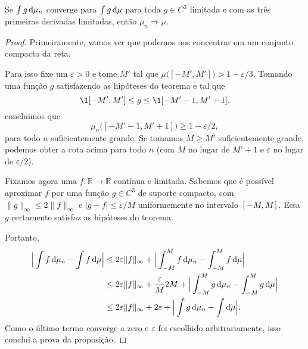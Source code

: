 \begin{proposition}
  \label{p:conv_distr_suave}
  Se $\int g \mathop{}\!\mathrm{d} \mu_n$ converge para $\int g \mathop{}\!\mathrm{d} \mu$ para toda $g \in C^3$ limitada e com as três primeiras derivadas limitadas, então $\mu_n \Rightarrow \mu$.
\end{proposition}

\begin{proof}
  Primeiramente, vamos ver que podemos nos concentrar em um conjunto compacto da reta.

  Para isso fixe um $\varepsilon > 0$ e tome $M'$ tal que $\mu\big( [-M', M'] \big) > 1 - \varepsilon / 3$.
  Tomando uma função $g$ satisfazendo as hipóteses do teorema e tal que
  \begin{equation}
    \1{[-M',M']} \leq g \leq \1{[-M'-1,M'+1]},
  \end{equation}
  concluimos que
  \begin{equation}
    \mu_n \big( [-M'-1, M'+1] \big) \geq 1 - \varepsilon/2,
  \end{equation}
  para todo $n$ suficientemente grande.
  Se tomamos $M \geq M'$ suficientemente grande, podemos obter a cota acima para todo $n$ (com $M$ no lugar de $M'+1$ e $\varepsilon$ no lugar de $\varepsilon/2$).

  Fixamos agora uma $f: \mathbb{R} \to \mathbb{R}$ contínua e limitada.
  Sabemos que é possível aproximar $f$ por uma função $g \in C^3$ de suporte compacto, com $\lVert g \rVert_\infty \leq 2 \lVert f \rVert_\infty$ e $|g - f| \leq \varepsilon/M$ uniformemente no intervalo $[-M,M]$.
  Essa $g$ certamente satisfaz as hipóteses do teorema.

  Portanto,
  \begin{equation*}
    \begin{split}
      \Big| \int f \d \mu_n - \int f \d \mu\Big| & \leq 2 \varepsilon \lVert f \rVert_\infty + \Big| \int_{-M}^M f \d \mu_n - \int_{-M}^M f \d \mu\Big|\\
      & \leq 2 \varepsilon \lVert f \rVert_\infty + \frac \varepsilon{M} 2 M + \Big| \int_{-M}^M g \d \mu_n - \int_{-M}^M g \d \mu\Big|\\
      & \leq 2 \varepsilon \lVert f \rVert_\infty + 2 \varepsilon + \Big| \int g \d \mu_n - \int \d \mu\Big|.
    \end{split}
  \end{equation*}
  Como o último termo converge a zero e $\varepsilon$ foi escolhido arbitrariamente, isso conclui a prova da proposição.
\end{proof}

